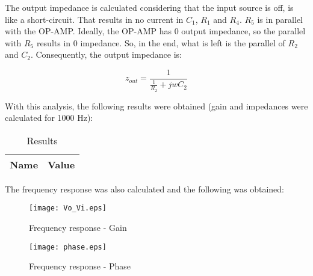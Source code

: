 The output impedance is calculated considering that the input source is off, is like a short-circuit. That results in no current in $C_1$, $R_1$ and $R_4$. $R_5$ is in parallel with the OP-AMP. Ideally, the OP-AMP has 0 output impedance, so the parallel with $R_5$ results in 0 impedance. So, in the end, what is left is the parallel of $R_2$ and $C_2$. Consequently, the output impedance is:

\begin{equation}
        z_{out} = \frac{1}{\frac{1}{R_2}+jwC_2}
\end{equation}

With this analysis, the following results were obtained (gain and impedances were calculated for 1000 Hz):

\begin{table}[H]
  \centering
  \begin{tabular}{|c|c|}
    \hline
        {\bf Name} & {\bf Value} \\
        \hline
        \hline
        
        \hline
  \end{tabular}
  \caption{Results}
  \label{teo_results}
\end{table}

The frequency response was also calculated and the following was obtained:

\begin{figure}[H]
        \centering
        \texttt{[image: Vo\_Vi.eps]}
        \caption{Frequency response - Gain}
        \label{tfrg}
\end{figure}

\begin{figure}[H]
        \centering
        \texttt{[image: phase.eps]}
        \caption{Frequency response - Phase}
        \label{tfrf}
\end{figure}
